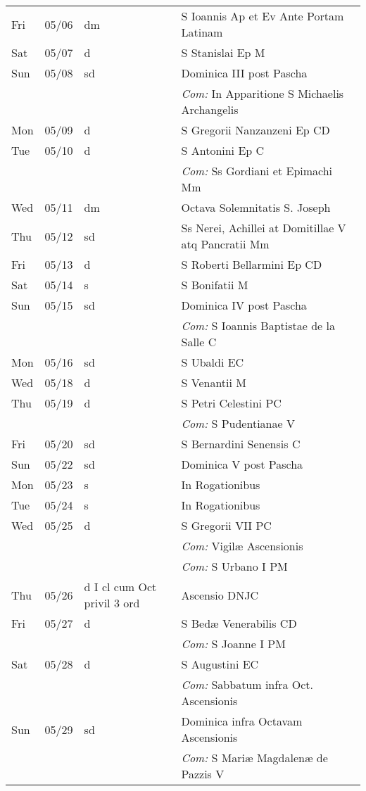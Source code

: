 \documentclass[10pt]{article}
\begin{document}
\begin{longtable}{ l l l l }
Fri & 05/06 & dm & S Ioannis Ap et Ev Ante Portam Latinam\\
Sat & 05/07 & d & S Stanislai Ep M\\
Sun & 05/08 & sd & Dominica III post Pascha\\
 & & & \textit{Com:} In Apparitione S Michaelis Archangelis\\
Mon & 05/09 & d & S Gregorii Nanzanzeni Ep CD\\
Tue & 05/10 & d & S Antonini Ep C\\
 & & & \textit{Com:} Ss Gordiani et Epimachi Mm\\
Wed & 05/11 & dm & Octava Solemnitatis S. Joseph\\
Thu & 05/12 & sd & Ss Nerei, Achillei at Domitillae V atq Pancratii Mm\\
Fri & 05/13 & d & S Roberti Bellarmini Ep CD\\
Sat & 05/14 & s & S Bonifatii M\\
Sun & 05/15 & sd & Dominica IV post Pascha\\
 & & & \textit{Com:} S Ioannis Baptistae de la Salle C\\
Mon & 05/16 & sd & S Ubaldi EC\\
Wed & 05/18 & d & S Venantii M\\
Thu & 05/19 & d & S Petri Celestini PC\\
 & & & \textit{Com:} S Pudentianae V\\
Fri & 05/20 & sd & S Bernardini Senensis C\\
Sun & 05/22 & sd & Dominica V post Pascha\\
Mon & 05/23 & s & In Rogationibus\\
Tue & 05/24 & s & In Rogationibus\\
Wed & 05/25 & d & S Gregorii VII PC\\
 & & & \textit{Com:} Vigilæ Ascensionis\\
 & & & \textit{Com:} S Urbano I PM\\
Thu & 05/26 & d I cl cum Oct privil 3 ord & Ascensio DNJC\\
Fri & 05/27 & d & S Bedæ Venerabilis CD\\
 & & & \textit{Com:} S Joanne I PM\\
Sat & 05/28 & d & S Augustini EC\\
 & & & \textit{Com:} Sabbatum infra Oct. Ascensionis\\
Sun & 05/29 & sd & Dominica infra Octavam Ascensionis\\
 & & & \textit{Com:} S Mariæ Magdalenæ de Pazzis V\\

\end{longtable}
\end{document}
